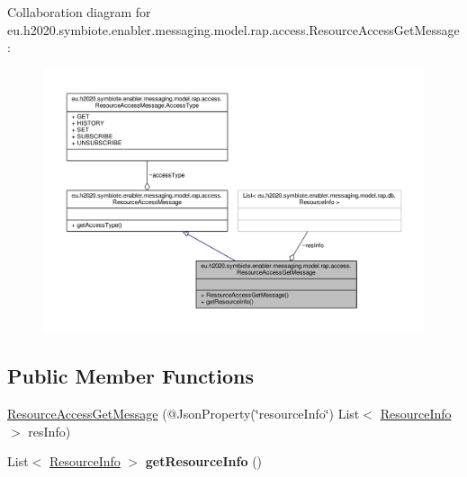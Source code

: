 Collaboration diagram for eu.\+h2020.\+symbiote.\+enabler.\+messaging.\+model.\+rap.\+access.\+Resource\+Access\+Get\+Message\+:
\nopagebreak
\begin{figure}[H]
\begin{center}
\leavevmode
\includegraphics[width=350pt]{classeu_1_1h2020_1_1symbiote_1_1enabler_1_1messaging_1_1model_1_1rap_1_1access_1_1ResourceAccessGetMessage__coll__graph}
\end{center}
\end{figure}
\subsection*{Public Member Functions}
\begin{DoxyCompactItemize}
\item 
\hyperlink{classeu_1_1h2020_1_1symbiote_1_1enabler_1_1messaging_1_1model_1_1rap_1_1access_1_1ResourceAccessGetMessage_a539d5238081dabe82785d5323e6fb70e}{Resource\+Access\+Get\+Message} (@Json\+Property(\char`\"{}resource\+Info\char`\"{}) List$<$ \hyperlink{classeu_1_1h2020_1_1symbiote_1_1enabler_1_1messaging_1_1model_1_1rap_1_1db_1_1ResourceInfo}{Resource\+Info} $>$ res\+Info)
\item 
\mbox{\label{classeu_1_1h2020_1_1symbiote_1_1enabler_1_1messaging_1_1model_1_1rap_1_1access_1_1ResourceAccessGetMessage_ac33975cf4bd10df4949ce258df877c16}} 
List$<$ \hyperlink{classeu_1_1h2020_1_1symbiote_1_1enabler_1_1messaging_1_1model_1_1rap_1_1db_1_1ResourceInfo}{Resource\+Info} $>$ {\bfseries get\+Resource\+Info} ()
\end{DoxyCompactItemize}


